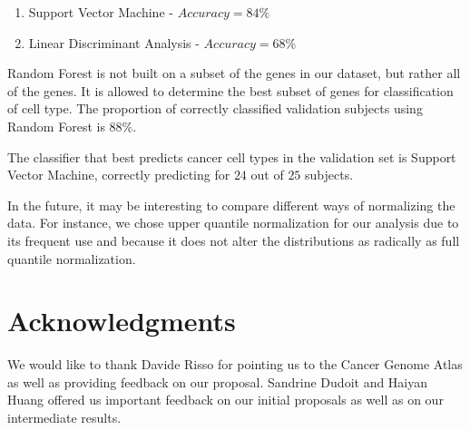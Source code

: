\begin{enumerate}
\item Support Vector Machine - $Accuracy = 84\% $
\item Linear Discriminant Analysis - $Accuracy =68\% $
\end{enumerate}

Random Forest is not built on a subset of the genes in our dataset, but rather
all of the genes. It is allowed to determine the best subset of genes for
classification of cell type. The proportion of correctly classified validation
subjects using Random Forest is $88\%$.

The classifier that best predicts cancer cell types in the validation set is
Support Vector Machine, correctly predicting for $24$ out of $25$ subjects.

In the future,  it may be interesting to compare different ways of normalizing
the data. For instance, we chose upper quantile normalization for our analysis
due to its frequent use and because it does not alter the distributions as radically
as full quantile normalization.


\section*{Acknowledgments}

We would like to thank Davide Risso for pointing us to the Cancer Genome Atlas
as well as providing feedback on our proposal. Sandrine Dudoit and Haiyan Huang
offered us important feedback on our initial proposals as well as on our
intermediate results. 




